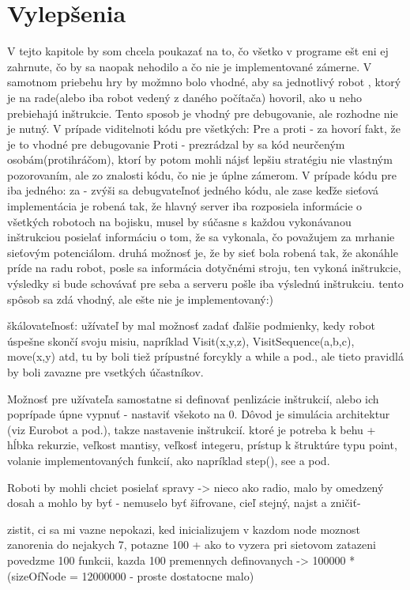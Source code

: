 \chapter{Vylepšenia}
V tejto kapitole by som chcela poukazať na to, čo všetko v programe ešt eni ej zahrnute, čo by sa naopak nehodilo a čo nie je implementované zámerne.
V samotnom priebehu hry by možmno bolo vhodné, aby sa jednotlivý robot , ktorý je na rade(alebo iba robot vedený z daného počítača) hovoril, ako u neho prebiehajú inštrukcie. Tento sposob je vhodný pre debugovanie, ale rozhodne nie je nutný.
V prípade viditelnoti kódu pre všetkých:
Pre a proti - za hovorí fakt, že je to vhodné pre debugovanie
Proti - prezrádzal by sa kód neurčeným osobám(protihráčom), ktorí by potom mohli nájsť lepšiu stratégiu nie vlastným pozorovaním, ale zo znalosti kódu, čo nie je úplne zámerom.
V prípade kódu pre iba jedného:
za - zvýši sa debugvateľnoť jedného kódu, ale zase keďže sieťová implementácia je robená tak, že hlavný server iba rozposiela informácie o všetkých robotoch na bojisku, musel by súčasne s každou vykonávanou inštrukciou posielať informáciu o tom, že sa vykonala, čo považujem za mrhanie sieťovým potenciálom. druhá možnosť je, že by sieť bola robená tak, že akonáhle príde na radu robot, posle sa informácia dotyčnémi stroju, ten vykoná inštrukcie, výsledky si bude schovávať pre seba a serveru pošle iba výslednú inštrukciu. tento spôsob sa zdá vhodný, ale ešte nie je implementovaný:)

škálovateľnosť:
užívateľ by mal možnosť zadať ďalšie podmienky, kedy robot úspešne skončí svoju misiu, napríklad Visit(x,y,z), VisitSequence(a,b,c), move(x,y) atd, tu by boli tiež prípustné forcykly  a while a pod., ale tieto pravidlá by boli zavazne pre vsetkých účastníkov.

Možnosť pre užívateľa samostatne si definovať penlizácie inštrukcií, alebo ich poprípade úpne vypnuť - nastaviť všekoto na 0. Dôvod je simulácia architektur (viz Eurobot a pod.), takze nastavenie inštrukcií. ktoré je potreba k behu + hĺbka rekurzie, veľkost mantisy, veľkosť integeru, prístup k štruktúre typu point, volanie implementovaných funkcií, ako napríklad step(), see a pod.

Roboti by mohli chciet posielať spravy -> nieco ako radio, malo by omedzený dosah a mohlo by byť - nemuselo byť šifrovane, cieľ stejný, najst a zničiť-

zistit, ci sa mi vazne nepokazi, ked inicializujem v kazdom node moznost zanorenia do nejakych 7, potazne 100 + ako to vyzera pri sietovom zatazeni
povedzme 100 funkcii, kazda 100 premennych definovanych -> 100000 * (sizeOfNode = 12000000 - proste dostatocne malo)
